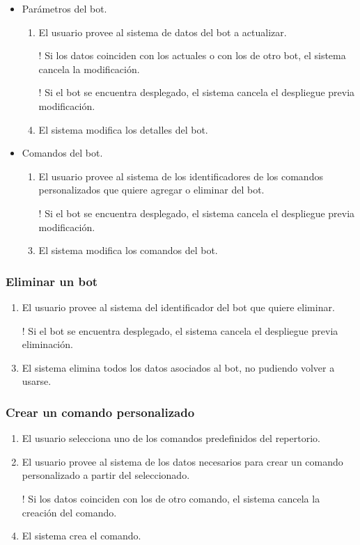 \begin{itemize}
	\item Parámetros del bot.
	\begin{enumerate}
		\item El usuario provee al sistema de datos del bot a actualizar.
		\item[!] Si los datos coinciden con los actuales o con los de otro bot, el sistema cancela la modificación.
		\item[!] Si el bot se encuentra desplegado, el sistema cancela el despliegue previa modificación.
		\item El sistema modifica los detalles del bot.
	\end{enumerate}
	
	\item Comandos del bot.
	\begin{enumerate}
		\item El usuario provee al sistema de los identificadores de los comandos personalizados que quiere agregar o eliminar del bot.
		\item[!] Si el bot se encuentra desplegado, el sistema cancela el despliegue previa modificación.
		\item El sistema modifica los comandos del bot.
	\end{enumerate}
\end{itemize}

\subsubsection{Eliminar un bot}

\begin{enumerate}
	\item El usuario provee al sistema del identificador del bot que quiere eliminar.
	\item[!] Si el bot se encuentra desplegado, el sistema cancela el despliegue previa eliminación.
	\item El sistema elimina todos los datos asociados al bot, no pudiendo volver a usarse.
\end{enumerate}

\subsubsection{Crear un comando personalizado}

\begin{enumerate}
	\item El usuario selecciona uno de los comandos predefinidos del repertorio.
	\item El usuario provee al sistema de los datos necesarios para crear un comando personalizado a partir del seleccionado.
	\item[!] Si los datos coinciden con los de otro comando, el sistema cancela la creación del comando.
	\item El sistema crea el comando.
\end{enumerate}

